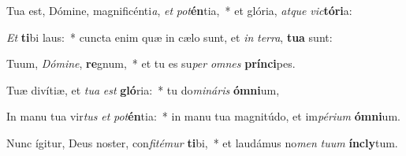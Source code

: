 \item Tua est, Dómine, magnificénti\textit{a}, \textit{et} \textit{pot}\textbf{én}tia,~* et glória, \textit{at}\textit{que} \textit{vic}\textbf{tó}\textbf{ri}a:
\item \textit{Et} \textbf{ti}bi laus:~* cuncta enim quæ in cælo sunt, et \textit{in} \textit{ter}\textit{ra}, \textbf{tu}\textbf{a} sunt:
\item Tuum, \textit{Dó}\textit{mi}\textit{ne}, \textbf{re}gnum,~* et tu es su\textit{per} \textit{om}\textit{nes} \textbf{prín}\textbf{ci}pes.
\item Tuæ divítiæ, et \textit{tu}\textit{a} \textit{est} \textbf{gló}ria:~* tu do\textit{mi}\textit{ná}\textit{ris} \textbf{óm}\textbf{ni}um,
\item In manu tua vir\textit{tus} \textit{et} \textit{pot}\textbf{én}tia:~* in manu tua magnitúdo, et im\textit{pé}\textit{ri}\textit{um} \textbf{óm}\textbf{ni}um.
\item Nunc ígitur, Deus noster, con\textit{fi}\textit{té}\textit{mur} \textbf{ti}bi,~* et laudámus no\textit{men} \textit{tu}\textit{um} \textbf{ín}\textbf{cly}tum.
